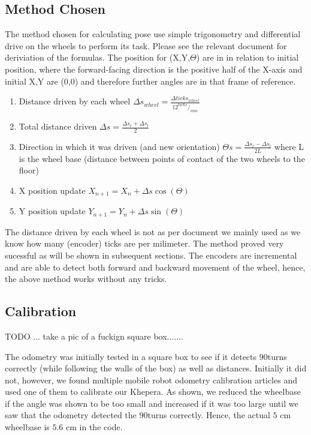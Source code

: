 \documentclass[11pt, a4paper]{article}
\begin{document}
\subsection{Method Chosen}

The method chosen for calculating pose\cite{odo_used} use simple trigonometry and differential drive on 
the wheels to perform its task. Please see the relevant document for deriviation of the formulas. The position for 
(X,Y,$\Theta$) are in in relation to initial position, where the forward-facing direction is the positive half of the
X-axis and initial X,Y are ($0$,$0$) and therefore further angles are in that frame of reference.

\begin{enumerate}

	\item Distance driven by each wheel $\Delta s_{wheel} = \frac {\Delta ticks_{wheel} } {12 ^{ticks}/_{mm}} $
	\item Total distance driven $ \Delta s = \frac{\Delta s_{r} + \Delta s_{l} }{2}$
	\item Direction in which it was driven (and new orientation) $\Theta s = \frac{ \Delta s_{r} - \Delta s_{l} }{2L}$ where L is the wheel base 
	(distance between points of contact of the two wheels to the floor)
	\item X position update $X_{n+1} = X_{n} + \Delta s \cos (\Theta)$
	\item Y position update $Y_{n+1} = Y_{n} + \Delta s \sin (\Theta)$


\end{enumerate}


The distance driven by each wheel is not as per document we mainly used as we know 
how many (encoder) ticks are per milimeter. The method proved very sucessful as 
will be shown in subsequent sections. The encoders are incremental and are able to 
detect both forward and backward movement of the wheel, hence, the above method works 
without any tricks.

\subsection{Calibration}

TODO ... take a pic of a fuckign square box.......

The odometry was initially tested in a square box to see if it detects $90$\degree turns correctly 
(while following the walls of the box) as well as distances. Initially it did not, however, we 
found multiple mobile robot odometry calibration articles and used one of them\cite{odo_calibration}
 to calibrate our Khepera. As shown, we reduced the wheelbase if the angle was shown to be too small 
and increased if it was too large until we saw that the odometry detected the  $90$\degree turns correctly. 
Hence, the actual $5$ cm wheelbase is $5.6$ cm in the code.
\end{document}
